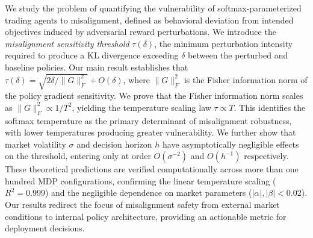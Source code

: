 We study the problem of quantifying the vulnerability of softmax-parameterized
trading agents to misalignment, defined as behavioral deviation from intended
objectives induced by adversarial reward perturbations. We introduce the
\emph{misalignment sensitivity threshold} $\tau(\delta)$, the minimum
perturbation intensity required to produce a KL divergence exceeding $\delta$
between the perturbed and baseline policies. Our main result establishes that
$\tau(\delta) = \sqrt{2\delta / \lVert G \rVert_F^2} + O(\delta)$, where
$\lVert G \rVert_F^2$ is the Fisher information norm of the policy gradient
sensitivity. We prove that the Fisher information norm scales as
$\lVert G \rVert_F^2 \propto 1/T^2$, yielding the temperature scaling law
$\tau \propto T$. This identifies the softmax temperature as the primary
determinant of misalignment robustness, with lower temperatures producing
greater vulnerability. We further show that market volatility $\sigma$ and
decision horizon $h$ have asymptotically negligible effects on the threshold,
entering only at order $O(\sigma^{-2})$ and $O(h^{-1})$ respectively. These
theoretical predictions are verified computationally across more than one
hundred MDP configurations, confirming the linear temperature scaling
($R^2 = 0.999$) and the negligible dependence on market parameters
($|\alpha|, |\beta| < 0.02$). Our results redirect the focus of misalignment
safety from external market conditions to internal policy architecture, providing
an actionable metric for deployment decisions.
